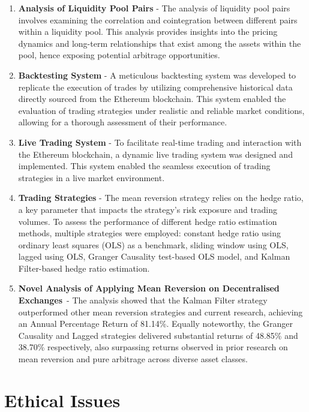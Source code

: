 \begin{enumerate}[wide, labelwidth=!, labelindent=2ex]
    \itemsep-0.1em
    \item \textbf{Analysis of Liquidity Pool Pairs} - The analysis of liquidity pool pairs involves examining the correlation and cointegration between different pairs within a liquidity pool. This analysis provides insights into the pricing dynamics and long-term relationships that exist among the assets within the pool, hence exposing potential arbitrage opportunities. 
    \item \textbf{Backtesting System} - A meticulous backtesting system was developed to replicate the execution of trades by utilizing comprehensive historical data directly sourced from the Ethereum blockchain. This system enabled the evaluation of trading strategies under realistic and reliable market conditions, allowing for a thorough assessment of their performance.
    \item \textbf{Live Trading System} - To facilitate real-time trading and interaction with the Ethereum blockchain, a dynamic live trading system was designed and implemented. This system enabled the seamless execution of trading strategies in a live market environment.
    \item \textbf{Trading Strategies} - The mean reversion strategy relies on the hedge ratio, a key parameter that impacts the strategy's risk exposure and trading volumes. To assess the performance of different hedge ratio estimation methods, multiple strategies were employed: constant hedge ratio using ordinary least squares (OLS) as a benchmark, sliding window using OLS, lagged using OLS, Granger Causality test-based OLS model, and Kalman Filter-based hedge ratio estimation.
    \item \textbf{Novel Analysis of Applying Mean Reversion on Decentralised Exchanges}~- The analysis showed that the Kalman Filter strategy outperformed other mean reversion strategies and current research, achieving an Annual Percentage Return of 81.14\%. Equally noteworthy, the Granger Causality and Lagged strategies delivered substantial returns of 48.85\% and 38.70\% respectively, also surpassing returns observed in prior research on mean reversion and pure arbitrage across diverse asset classes.
\end{enumerate}

\section{Ethical Issues}

